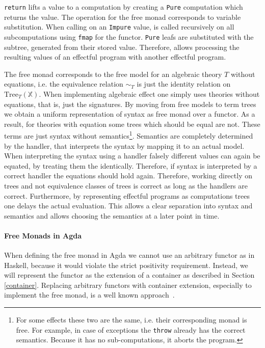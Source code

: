 \texttt{return} lifts a value to a computation by creating a
\texttt{Pure} computation which returns the value.
The \bind{} operation for the free monad corresponds to variable substitution.
When calling \bind{} on an \texttt{Impure} value, \bind{} is called
recursively on all subcomputations using \texttt{fmap} for the
functor.
\texttt{Pure} leafs are substituted with the subtree, generated
from their stored value.
Therefore, \bind{} allows processing the resulting values of an effectful
program with another effectful program.

The free monad corresponds to the free model for an algebraic theory $T$ without
equations, i.e. the equivalence relation $\sim_T$ is just the identity relation on
$\mathrm{Tree}_T(\mathbb{X})$.
When implementing algebraic effect one simply uses theories without equations,
that is, just the signatures.
By moving from free models to term trees we obtain a uniform representation of
syntax as free monad over a functor.
As a result, for theories with equation some trees which should be equal are
not.
These terms are just syntax without semantics\footnote{For some effects these
  two are the same, i.e. their corresponding monad is free.
  For example, in case of exceptions the \texttt{throw} already has the correct
  semantics.
  Because it has no sub-computations, it aborts the program.}.
Semantics are completely determined by the handler, that interprets the syntax
by mapping it to an actual model.
When interpreting the syntax using a handler falsely different values can again
be equated, by treating them the identically.
Therefore, if syntax is interpreted by a correct handler the equations should
hold again.
Therefore, working directly on trees and not equivalence classes of trees is
correct as long as the handlers are correct.
Furthermore, by representing effectful programs as computations trees one delays
the actual evaluation.
This allows a clear separation into syntax and semantics and allows choosing the
semantics at a later point in time.

\paragraph{Free Monads in Agda}
When defining the free monad in Agda we cannot use an arbitrary functor as in
Haskell, because it would violate the strict positivity requirement.
Instead, we will represent the functor as the extension of a container as
described in Section \ref{container}.
Replacing arbitrary functors with container extension, especially to implement
the free monad, is a well known
approach~\cite{DBLP:journals/programming/DylusCT19,DBLP:conf/haskell/ChristiansenDB19,DBLP:conf/mpc/McBride15}.

